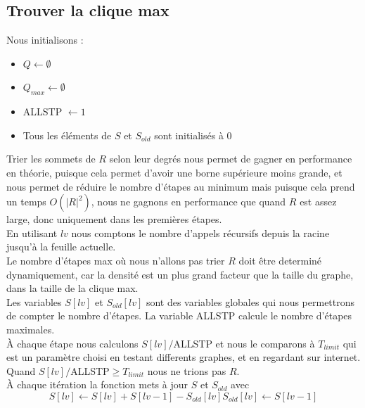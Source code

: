 \documentclass{article}
\begin{document}
\subsection{Trouver la clique max}
Nous initialisons :
\begin{itemize}
  \item $Q \gets \emptyset$
  \item $Q_{max} \gets \emptyset$
  \item ALLSTP $\gets 1$
  \item Tous les éléments de $S$ et $S_{old}$ sont initialisés à 0
\end{itemize}
Trier les sommets de $R$ selon leur degrés nous permet de gagner en performance en théorie, puisque
cela permet d'avoir une borne supérieure moins grande, et nous permet de réduire le nombre d'étapes
au minimum mais puisque cela prend un temps $O(|R|^2)$, nous ne gagnons en performance que quand
$R$ est assez large, donc uniquement dans les premières étapes.\\
En utilisant $lv$ nous comptons le nombre d'appels récursifs depuis la racine jusqu'à la feuille
actuelle. \\
Le nombre d'étapes max où nous n'allons pas trier $R$ doit être determiné dynamiquement, car la densité
est un plus grand facteur que la taille du graphe, dans la taille de la clique max.\\
Les variables $S[lv]$ et $S_{old}[lv]$ sont des variables globales qui nous permettrons de compter
le nombre d'étapes. La variable ALLSTP calcule le nombre d'étapes maximales.\\
À chaque étape nous calculons $S[lv]/$ALLSTP et nous le comparons à $T_{limit}$ qui est un paramètre
choisi en testant differents graphes, et en regardant sur internet. \\
Quand $S[lv]/$ALLSTP$ \geq T_{limit}$ nous ne trions pas $R$.\\
À chaque itération la fonction mets à jour $S$ et $S_{old}$ avec
\begin{displaymath}
  S[lv] \gets S[lv] + S[lv-1] -S_{old}[lv]
  S_{old}[lv]\gets S[lv-1]
\end{displaymath}
\end{document}
